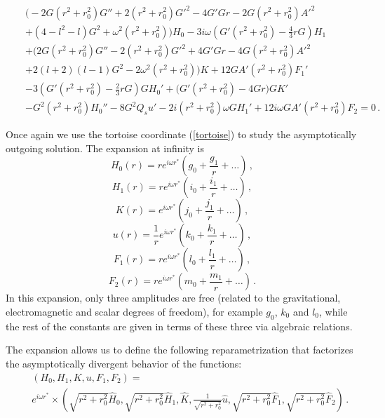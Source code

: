 \documentclass[11pt,a4paper]{article}
\begin{document}
\begin{eqnarray}
\label{alg_rel}
    && \biggl(-2G(r^2+r_0^2)G''+2(r^2+r_0^2)G'^2-4G'Gr-2G(r^2+r_0^2)A'^2 \\
    && +(4-l^2-l)G^2+\omega^2(r^2+r_0^2)\biggr)H_0-3i\omega\left(G'(r^2+r_0^2)-\frac{4}{3}rG\right)H_1  \nonumber \\
    && + \biggl(2G(r^2+r_0^2)G''
   -2(r^2+r_0^2)G'^2+4G'Gr-4G(r^2+r_0^2)A'^2 
    \nonumber \\
    && +2(l+2)(l-1)G^2-2\omega^2(r^2+r_0^2)\biggr)K 
    +12GA'(r^2+r_0^2)F_1' 
    \nonumber \\
    && -3\left(G'(r^2+r_0^2)-\frac{2}{3}rG\right)GH_0'+\biggl(G'(r^2+r_0^2)-4Gr\biggr)GK' \nonumber \\
    && -G^2(r^2+r_0^2)H_0''-8G^2Q_su'-2i(r^2+r_0^2)\omega GH_1'+12i\omega GA'(r^2+r_0^2)F_2=0 \,. \nonumber 
\end{eqnarray}
%

Once again we use the tortoise coordinate (\ref{tortoise}) to study the asymptotically outgoing solution.
The expansion at infinity is
%
\begin{equation}
    H_0(r)=re^{i\omega r^*}\left(g_0+\frac{g_1}{r}+\dots\right)\,,
\end{equation}
%
\begin{equation}
    H_1(r)=re^{i\omega r^*}\left(i_0+\frac{i_1}{r}+\dots\right) \,,
\end{equation}
%
\begin{equation}
    K(r)=e^{i\omega r^*}\left(j_0+\frac{j_1}{r}+\dots\right) \,,
\end{equation}
%
\begin{equation}
    u(r)=\frac{1}{r}e^{i\omega r^*}\left(k_0+\frac{k_1}{r}+\dots\right) \,,
\end{equation}
%
\begin{equation}
    F_1(r)=re^{i\omega r^*}\left(l_0+\frac{l_1}{r}+\dots\right) \,,
\end{equation}
%
\begin{equation}
    F_2(r)=re^{i\omega r^*}\left(m_0+\frac{m_1}{r}+\dots\right) \,.
\end{equation}
%
In this expansion, only three amplitudes are free (related to the gravitational, electromagnetic and scalar degrees of freedom), for example $g_0$, $k_0$ and $l_0$, while the rest of the constants are given in terms of these three via algebraic relations.

The expansion allows us to define the following reparametrization that factorizes the asymptotically divergent behavior of the functions:
\begin{eqnarray}
   && (H_0,H_1,K,u,F_1,F_2) =  \\ 
   && e^{i\omega r^*} \times
   \left(
   \sqrt{r^2+r_0^2}\hat{H}_0, \sqrt{r^2+r_0^2}\hat{H}_1, \hat{K}, \frac{1}{\sqrt{r^2+r_0^2}}\hat{u}, \sqrt{r^2+r_0^2}\hat{F}_1, \sqrt{r^2+r_0^2}\hat{F}_2
   \right) \,.
     \nonumber
\end{eqnarray}
\end{document}
